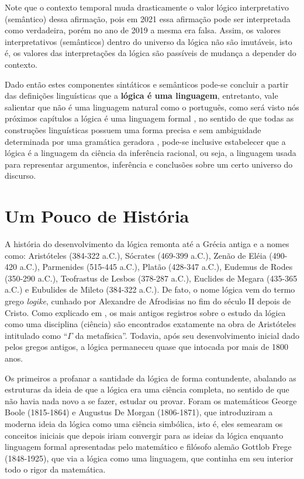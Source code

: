 Note que o contexto temporal muda drasticamente o valor lógico interpretativo (semântico) dessa afirmação, pois em 2021 essa afirmação pode ser interpretada como verdadeira, porém no ano de 2019 a mesma era falsa. Assim, os valores interpretativos (semânticos) dentro do universo da lógica não são imutáveis, isto é, os valores das interpretações da lógica são passíveis de mudança a depender do contexto.

Dado então estes componentes sintáticos e semânticos pode-se concluir a partir das definições linguísticas que a \textbf{lógica é uma linguagem}, entretanto, vale salientar que não é uma linguagem natural como o português, como será visto nós próximos capítulos a lógica é uma linguagem formal \cite{benjaLivro2010}, no sentido de que todas as construções linguísticas possuem uma forma precisa e sem ambiguidade determinada por uma gramática geradora \cite{hopcroft2008, linz2006}, pode-se inclusive estabelecer que a lógica é a linguagem da ciência da inferência racional, ou seja, a linguagem usada para representar argumentos, inferência e conclusões sobre um certo universo do discurso.

\section{Um Pouco de História}\label{sec:LogicsHistory}

A história do desenvolvimento da lógica remonta até a Grécia antiga e a nomes como: Aristóteles (384-322 a.C.), Sócrates (469-399 a.C.), Zenão de Eléia (490-420 a.C.), Parmenides (515-445 a.C.), Platão (428-347 a.C.), Eudemus de Rodes (350-290 a.C.), Teofrastus de Lesbos (378-287 a.C.), Euclides de Megara (435-365 a.C.) e Eubulides de Mileto (384-322 a.C.). De fato, o nome lógica vem do termo grego \textit{logike}, cunhado por Alexandre de Afrodisias no fim do século II depois de Cristo. Como explicado em \cite{abe2002-logica}, os mais antigos registros sobre o estudo da lógica como uma disciplina (ciência) são encontrados exatamente na obra de Aristóteles intitulado como ``$\Gamma$ da metafísica''. Todavia, após seu desenvolvimento inicial dado pelos gregos antigos, a lógica permaneceu quase que intocada por mais de 1800 anos.

Os primeiros a profanar a santidade da lógica de forma contundente, abalando as estruturas da ideia de que a lógica era uma ciência completa, no sentido de que não havia nada novo a se fazer, estudar ou provar. Foram os matemáticos George Boole (1815-1864) e Augustus De Morgan (1806-1871), que introduziram a moderna ideia da lógica como uma ciência simbólica, isto é, eles semearam os conceitos iniciais que depois iriam convergir para as ideias da lógica enquanto linguagem formal apresentadas pelo matemático e filósofo alemão Gottlob Frege (1848-1925), que via a lógica como uma linguagem, que continha em seu interior todo o rigor da matemática.

